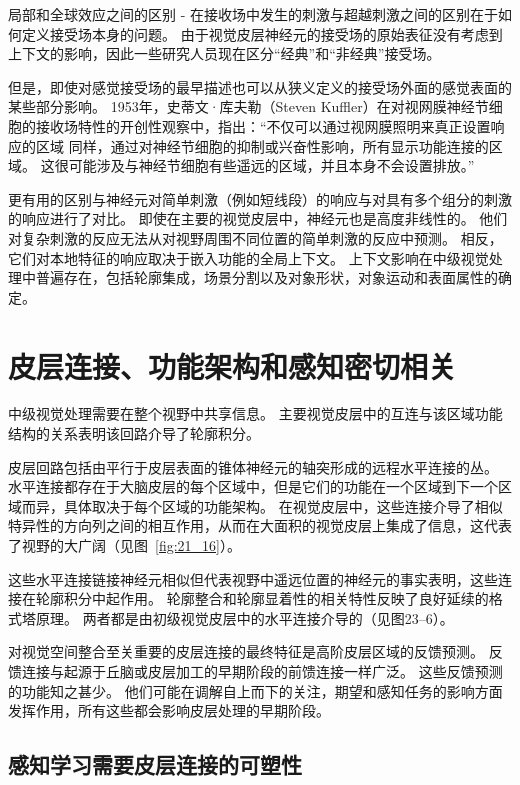 局部和全球效应之间的区别 - 在接收场中发生的刺激与超越刺激之间的区别在于如何定义接受场本身的问题。
由于视觉皮层神经元的接受场的原始表征没有考虑到上下文的影响，因此一些研究人员现在区分“经典”和“非经典”接受场。


但是，即使对感觉接受场的最早描述也可以从狭义定义的接受场外面的感觉表面的某些部分影响。
1953年，史蒂文·库夫勒（Steven Kuffler）在对视网膜神经节细胞的接收场特性的开创性观察中，指出：“不仅可以通过视网膜照明来真正设置响应的区域 同样，通过对神经节细胞的抑制或兴奋性影响，所有显示功能连接的区域。
这很可能涉及与神经节细胞有些遥远的区域，并且本身不会设置排放。”


更有用的区别与神经元对简单刺激（例如短线段）的响应与对具有多个组分的刺激的响应进行了对比。
即使在主要的视觉皮层中，神经元也是高度非线性的。
他们对复杂刺激的反应无法从对视野周围不同位置的简单刺激的反应中预测。
相反，它们对本地特征的响应取决于嵌入功能的全局上下文。
上下文影响在中级视觉处理中普遍存在，包括轮廓集成，场景分割以及对象形状，对象运动和表面属性的确定。



\section{皮层连接、功能架构和感知密切相关}

中级视觉处理需要在整个视野中共享信息。
主要视觉皮层中的互连与该区域功能结构的关系表明该回路介导了轮廓积分。


皮层回路包括由平行于皮层表面的锥体神经元的轴突形成的远程水平连接的丛。
水平连接都存在于大脑皮层的每个区域中，但是它们的功能在一个区域到下一个区域而异，具体取决于每个区域的功能架构。
在视觉皮层中，这些连接介导了相似特异性的方向列之间的相互作用，从而在大面积的视觉皮层上集成了信息，这代表了视野的大广阔（见图~\ref{fig:21_16}）。


这些水平连接链接神经元相似但代表视野中遥远位置的神经元的事实表明，这些连接在轮廓积分中起作用。
轮廓整合和轮廓显着性的相关特性反映了良好延续的格式塔原理。 两者都是由初级视觉皮层中的水平连接介导的（见图23–6）。


对视觉空间整合至关重要的皮层连接的最终特征是高阶皮层区域的反馈预测。
反馈连接与起源于丘脑或皮层加工的早期阶段的前馈连接一样广泛。
这些反馈预测的功能知之甚少。
他们可能在调解自上而下的关注，期望和感知任务的影响方面发挥作用，所有这些都会影响皮层处理的早期阶段。



\subsection{感知学习需要皮层连接的可塑性}

